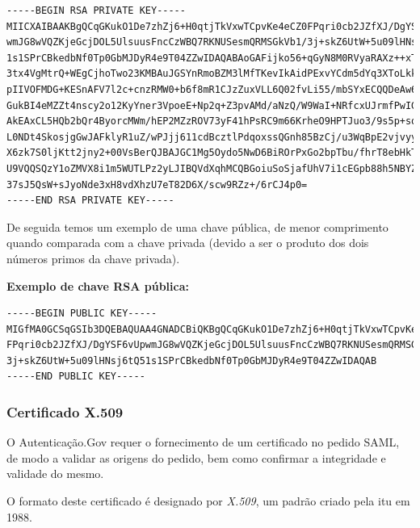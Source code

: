 \begin{verbatim}
-----BEGIN RSA PRIVATE KEY-----
MIICXAIBAAKBgQCqGKukO1De7zhZj6+H0qtjTkVxwTCpvKe4eCZ0FPqri0cb2JZfXJ/DgYSF6vUp
wmJG8wVQZKjeGcjDOL5UlsuusFncCzWBQ7RKNUSesmQRMSGkVb1/3j+skZ6UtW+5u09lHNsj6tQ5
1s1SPrCBkedbNf0Tp0GbMJDyR4e9T04ZZwIDAQABAoGAFijko56+qGyN8M0RVyaRAXz++xTqHBLh
3tx4VgMtrQ+WEgCjhoTwo23KMBAuJGSYnRmoBZM3lMfTKevIkAidPExvYCdm5dYq3XToLkkLv5L2
pIIVOFMDG+KESnAFV7l2c+cnzRMW0+b6f8mR1CJzZuxVLL6Q02fvLi55/mbSYxECQQDeAw6fiIQX
GukBI4eMZZt4nscy2o12KyYner3VpoeE+Np2q+Z3pvAMd/aNzQ/W9WaI+NRfcxUJrmfPwIGm63il
AkEAxCL5HQb2bQr4ByorcMWm/hEP2MZzROV73yF41hPsRC9m66KrheO9HPTJuo3/9s5p+sqGxOlF
L0NDt4SkosjgGwJAFklyR1uZ/wPJjj611cdBcztlPdqoxssQGnh85BzCj/u3WqBpE2vjvyyvyI5k
X6zk7S0ljKtt2jny2+00VsBerQJBAJGC1Mg5Oydo5NwD6BiROrPxGo2bpTbu/fhrT8ebHkTz2epl
U9VQQSQzY1oZMVX8i1m5WUTLPz2yLJIBQVdXqhMCQBGoiuSoSjafUhV7i1cEGpb88h5NBYZzWXGZ
37sJ5QsW+sJyoNde3xH8vdXhzU7eT82D6X/scw9RZz+/6rCJ4p0=
-----END RSA PRIVATE KEY-----
\end{verbatim}

De seguida temos um exemplo de uma chave pública, de menor comprimento quando comparada com a chave privada (devido a ser o produto dos dois números primos da chave privada).

\vspace{5mm}
\textbf{Exemplo de chave RSA pública:}

\begin{verbatim}
-----BEGIN PUBLIC KEY-----
MIGfMA0GCSqGSIb3DQEBAQUAA4GNADCBiQKBgQCqGKukO1De7zhZj6+H0qtjTkVxwTCpvKe4eCZ0
FPqri0cb2JZfXJ/DgYSF6vUpwmJG8wVQZKjeGcjDOL5UlsuusFncCzWBQ7RKNUSesmQRMSGkVb1/
3j+skZ6UtW+5u09lHNsj6tQ51s1SPrCBkedbNf0Tp0GbMJDyR4e9T04ZZwIDAQAB
-----END PUBLIC KEY-----
\end{verbatim}

\cleardoublepage
\subsubsection{Certificado X.509}

O Autenticação.Gov requer o fornecimento de um certificado no pedido SAML, de modo a validar as origens do pedido, bem como confirmar a integridade e validade do mesmo.

O formato deste certificado é designado por \emph{X.509}\cite{x509}, um padrão criado pela \gls{itu} em 1988.

